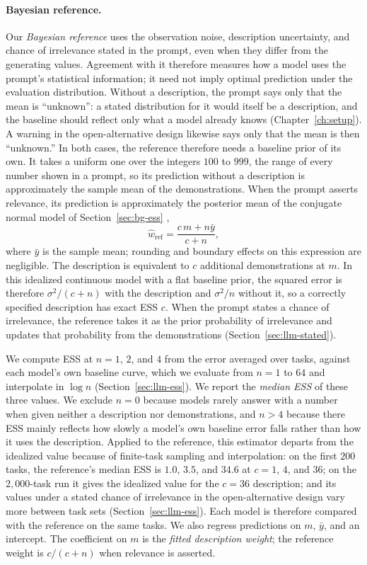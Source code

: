 \paragraph{Bayesian reference.}
Our \emph{Bayesian reference} uses the observation noise, description uncertainty, and chance of irrelevance stated in the prompt, even when they differ from the generating values. Agreement with it therefore measures how a model uses the prompt's statistical information; it need not imply optimal prediction under the evaluation distribution. Without a description, the prompt says only that the mean is ``unknown'': a stated distribution for it would itself be a description, and the baseline should reflect only what a model already knows (Chapter~\ref{ch:setup}). A warning in the open-alternative design likewise says only that the mean is then ``unknown.'' In both cases, the reference therefore needs a baseline prior of its own. It takes a uniform one over the integers $100$ to $999$, the range of every number shown in a prompt, so its prediction without a description is approximately the sample mean of the demonstrations. When the prompt asserts relevance, its prediction is approximately the posterior mean of the conjugate normal model of Section~\ref{sec:bg-ess} \citep{neuenschwander2020},
\begin{equation}\label{eq:scalar-rule}
\hat w_{\mathrm{ref}}=\frac{c\,m+n\bar y}{c+n},
\end{equation}
where $\bar y$ is the sample mean; rounding and boundary effects on this expression are negligible. The description is equivalent to $c$ additional demonstrations at $m$. In this idealized continuous model with a flat baseline prior, the squared error is therefore $\sigma^2/(c+n)$ with the description and $\sigma^2/n$ without it, so a correctly specified description has exact ESS $c$. When the prompt states a chance of irrelevance, the reference takes it as the prior probability of irrelevance and updates that probability from the demonstrations (Section~\ref{sec:llm-stated}).

We compute ESS at $n=1$, $2$, and $4$ from the error averaged over tasks, against each model's own baseline curve, which we evaluate from $n=1$ to $64$ and interpolate in $\log n$ (Section~\ref{sec:llm-ess}). We report the \emph{median ESS} of these three values. We exclude $n=0$ because models rarely answer with a number when given neither a description nor demonstrations, and $n>4$ because there ESS mainly reflects how slowly a model's own baseline error falls rather than how it uses the description. Applied to the reference, this estimator departs from the idealized value because of finite-task sampling and interpolation: on the first $200$ tasks, the reference's median ESS is $1.0$, $3.5$, and $34.6$ at $c=1$, $4$, and $36$; on the $2{,}000$-task run it gives the idealized value for the $c=36$ description; and its values under a stated chance of irrelevance in the open-alternative design vary more between task sets (Section~\ref{sec:llm-ess}). Each model is therefore compared with the reference on the same tasks. We also regress predictions on $m$, $\bar y$, and an intercept. The coefficient on $m$ is the \emph{fitted description weight}; the reference weight is $c/(c+n)$ when relevance is asserted.

